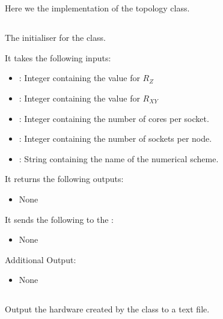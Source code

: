 \chapter{} %

\label{Chapter7} %

Here we the implementation of the topology class.

\section{}
The initialiser for the class.

It takes the following inputs:

\begin{itemize}
\item {}: Integer containing the value for \(R_Z\)
\item {}: Integer containing the value for \(R_{XY}\)
\item {}: Integer containing the number of cores per socket.
\item {}: Integer containing the number of sockets per node.
\item {}: String containing the name of the numerical scheme.
\end{itemize}

It returns the following outputs:

\begin{itemize}
\item None
\end{itemize}

It sends the following to the :

\begin{itemize}
\item None
\end{itemize}

Additional Output:
\begin{itemize}
\item None
\end{itemize}


\section{}
Output the hardware created by the class to a text file.

